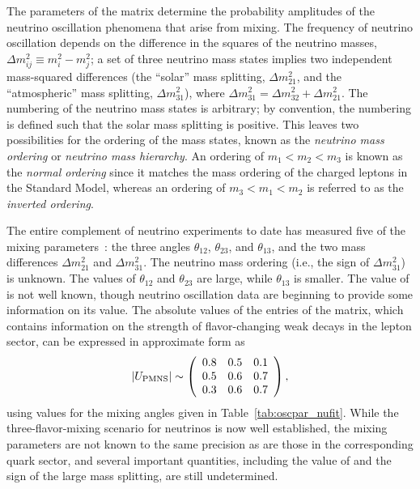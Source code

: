 The parameters of the 
matrix determine the probability amplitudes of the neutrino
oscillation phenomena that arise from mixing.  The frequency of neutrino oscillation 
depends on the difference in the squares of the neutrino
masses, $\Delta m^{2}_{ij} \equiv m^{2}_{i} - m^{2}_{j}$; a set of three
neutrino mass states implies two independent mass-squared differences
(the ``solar'' mass splitting, $\Delta m^{2}_{21}$, and the ``atmospheric'' mass splitting, 
$\Delta m^{2}_{31}$), where $\Delta m^{2}_{31} = \Delta m^{2}_{32} + \Delta m^{2}_{21}$. 
The numbering of the neutrino mass states is arbitrary; by convention, the numbering is defined such that the solar mass splitting is positive. This leaves two possibilities for
the ordering of the
mass states, known as the \emph{neutrino mass ordering} or \emph{neutrino mass hierarchy}. An ordering of
$m_1 < m_2 < m_3$ is known as the \emph{normal ordering} since it matches
the mass ordering of the charged leptons in the Standard Model, whereas an ordering of $m_3 < m_1 < m_2$
is referred to as the \emph{inverted ordering}.

The entire complement of neutrino experiments to date has measured
five of the mixing parameters~\cite{Esteban:2018azc,deSalas:2017kay,Capozzi:2017yic}: the three angles $\theta_{12}$,
$\theta_{23}$, and $\theta_{13}$, and the two mass differences
$\Delta m^{2}_{21}$ and $\Delta m^{2}_{31}$. 
The neutrino mass ordering (i.e., the sign of $\Delta m^{2}_{31}$) is unknown.
The values of $\theta_{12}$ and $\theta_{23}$ are large, while 
$\theta_{13}$ is smaller. The value of \deltacp is not well known, though neutrino oscillation data are beginning to provide some information on its value.
The absolute values of the entries of the  matrix, which
contains information on the strength of flavor-changing weak decays in
the lepton sector, can be expressed in approximate form as
\begin{equation}
|U_{\rm PMNS}|\sim \left(\begin{array}{ccc} 0.8 & 0.5 & 0.1 \\ 0.5 & 0.6 & 0.7 \\ 0.3 & 0.6 & 0.7\end{array} \right),
\label{eq:pmnsmatrix}
\end{equation}
using values for the mixing angles given in Table~\ref{tab:oscpar_nufit}. 
While the three-flavor-mixing scenario for neutrinos is now well
established, the mixing parameters are not known to the same precision 
as are those in the
corresponding quark sector, and several important quantities, including
the value of \deltacp and the sign of the large mass splitting, are
still undetermined.

